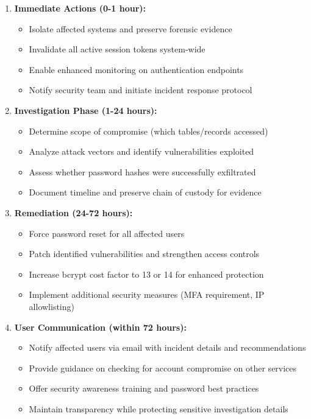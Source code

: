 \documentclass[12pt,a4paper]{article}
\begin{document}
\begin{enumerate}[leftmargin=2em, itemsep=6pt]
    \item \textbf{Immediate Actions (0-1 hour):}
    \begin{itemize}[leftmargin=2em, itemsep=4pt]
        \item Isolate affected systems and preserve forensic evidence
        \item Invalidate all active session tokens system-wide
        \item Enable enhanced monitoring on authentication endpoints
        \item Notify security team and initiate incident response protocol
    \end{itemize}
    
    \item \textbf{Investigation Phase (1-24 hours):}
    \begin{itemize}[leftmargin=2em, itemsep=4pt]
        \item Determine scope of compromise (which tables/records accessed)
        \item Analyze attack vectors and identify vulnerabilities exploited
        \item Assess whether password hashes were successfully exfiltrated
        \item Document timeline and preserve chain of custody for evidence
    \end{itemize}
    
    \item \textbf{Remediation (24-72 hours):}
    \begin{itemize}[leftmargin=2em, itemsep=4pt]
        \item Force password reset for all affected users
        \item Patch identified vulnerabilities and strengthen access controls
        \item Increase bcrypt cost factor to 13 or 14 for enhanced protection
        \item Implement additional security measures (MFA requirement, IP allowlisting)
    \end{itemize}
    
    \item \textbf{User Communication (within 72 hours):}
    \begin{itemize}[leftmargin=2em, itemsep=4pt]
        \item Notify affected users via email with incident details and recommendations
        \item Provide guidance on checking for account compromise on other services
        \item Offer security awareness training and password best practices
        \item Maintain transparency while protecting sensitive investigation details
    \end{itemize}
\end{enumerate}
\end{document}

